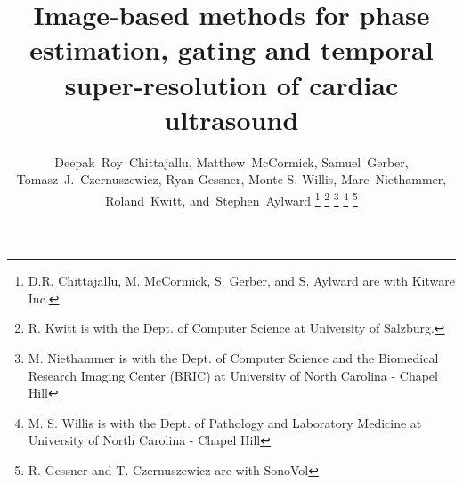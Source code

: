 \documentclass[journal]{IEEEtran}
\begin{document}
%
\title{Image-based methods for phase estimation, gating and temporal super-resolution of cardiac ultrasound}
%
%
%

\author{Deepak~Roy~Chittajallu,
        Matthew~McCormick,
        Samuel~Gerber,
        Tomasz~J.~Czernuszewicz,
        Ryan Gessner,
        Monte S. Willis,
        Marc~Niethammer,
        Roland~Kwitt,
        and~Stephen~Aylward%
\thanks{D.R. Chittajallu, M. McCormick, S. Gerber, and S. Aylward are with Kitware Inc.}%
\thanks{R. Kwitt is with the Dept. of Computer Science at University of Salzburg.}%
\thanks{M. Niethammer is with the Dept. of Computer Science and the Biomedical Research Imaging Center (BRIC) at University of North Carolina - Chapel Hill}%
\thanks{M. S. Willis is with the Dept. of Pathology and Laboratory Medicine at University of North Carolina - Chapel Hill}%
\thanks{R. Gessner and T. Czernuszewicz are with SonoVol}%
}

% 
%
\end{document}
